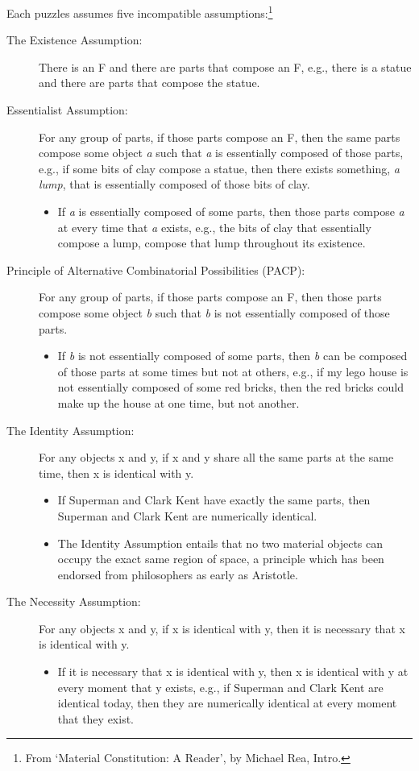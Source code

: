 \documentclass[oneside]{article}
\begin{document}
Each puzzles assumes five incompatible assumptions:\footnote{From `Material  Constitution: A  Reader',  by Michael Rea, Intro.}
\begin{description}
\item [The Existence Assumption:] There is an F and there are parts that compose an F, e.g., there is a statue and there are parts that compose the statue. 
\item [Essentialist Assumption:] For any group of parts, if those parts compose an F, then the same parts compose some object \emph{a} such that \emph{a} is essentially composed of those parts, e.g., if some bits of clay compose a statue, then there exists something, \emph{a lump}, that is essentially composed of those bits of clay. 
\begin{itemize}
\item If \emph{a} is essentially composed of some parts, then those parts compose \emph{a} at every time that \emph{a} exists, e.g., the bits of clay that essentially compose a lump, compose that lump throughout its existence. 
\end{itemize}
\item [Principle of Alternative Combinatorial Possibilities (PACP):] For any group of parts, if those parts compose an F, then those parts compose some object \emph{b} such that  \emph{b} is not essentially composed of those parts.
\begin{itemize}
\item If \emph{b} is not essentially composed of some parts, then \emph{b} can be composed of  those parts at some times but not at others, e.g., if my lego house is not essentially composed of some red bricks, then the red bricks could make up the house at one time, but not another. 
\end{itemize}
\item [The Identity Assumption:] For any objects x  and y, if x and y  share all the same parts at the same time, then x is identical with y. 
\begin{itemize}
\item If Superman and Clark Kent have exactly the same parts,  then Superman and Clark Kent are numerically identical. 
\item The Identity Assumption entails that no two material objects can occupy the exact same region of space, a principle which has been endorsed from philosophers as early as Aristotle. 
\end{itemize}

\item[The Necessity Assumption:] For any objects x  and y, if x is identical with y, then it is necessary that x is identical with y.
\begin{itemize}
\item If it is necessary that x is identical with y, then x is identical with y at every moment that y exists, e.g., if Superman and Clark Kent are identical today, then they are numerically identical at every moment that they exist. 
\end{itemize}
\end{description}
\end{document}
